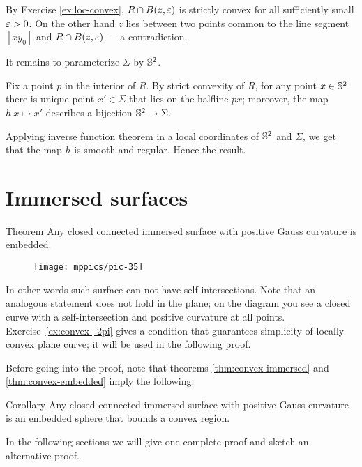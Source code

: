 By Exercise \ref{ex:loc-convex}, $R\cap B(z,\varepsilon)$ is strictly convex for all sufficiently small $\varepsilon>0$.
On the other hand $z$ lies between two points common to the line segment $[xy_0]$ and $R\cap B(z,\varepsilon)$ --- a contradiction.

It remains to parameterize $\Sigma$ by $\mathbb{S}^2$.

Fix a point $p$ in the interior of $R$.
By strict convexity of $R$, for any point $x\in \mathbb{S}^2$ there is unique point $x'\in \Sigma$ that lies on the halfline $px$;
moreover, the map $h\:x\mapsto x'$ describes a bijection $\mathbb{S}^2\to \Sigma$.

Applying inverse function theorem in a local coordinates of $\mathbb{S}^2$ and $\Sigma$,
we get that the map $h$ is smooth and regular.
Hence the result.
\qeds

\section{Immersed surfaces}

\begin{thm}{Theorem}\label{thm:convex-immersed}
Any closed connected immersed surface with positive Gauss curvature is embedded.
\end{thm}



\begin{wrapfigure}{r}{20 mm}
\vskip-0mm
\centering
\texttt{[image: mppics/pic-35]}
\vskip-0mm
\end{wrapfigure}

In other words such surface can not have self-intersections.
Note that an analogous statement does not hold in the plane;
on the diagram you see a closed curve with a self-intersection and positive curvature at all points.
Exercise~\ref{ex:convex+2pi} gives a condition that guarantees simplicity of locally convex plane curve;
it will be used in the following proof.



Before going into the proof, note that theorems \ref{thm:convex-immersed} and \ref{thm:convex-embedded}
imply the following:

\begin{thm}{Corollary}
Any closed connected immersed surface with positive Gauss curvature is an embedded sphere that bounds a convex region.
\end{thm}

In the following sections we will give one complete proof and sketch an alternative proof.

